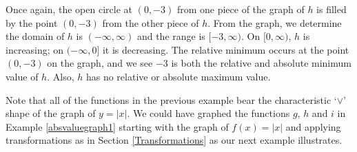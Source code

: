{\begin{enumerate}

Once again, the open circle at $(0,-3)$ from one piece of the graph of $h$ is filled by the point $(0,-3)$ from the other piece of $h$.  From the graph, we determine the domain of $h$ is $(-\infty, \infty)$ and the range is $[-3,\infty)$.   On $[0,\infty)$, $h$ is increasing;  on $(-\infty,0]$ it is decreasing.  The relative minimum occurs at the point $(0,-3)$ on the graph, and we see $-3$ is both the relative and absolute minimum value of $h$.  Also, $h$ has no relative or absolute maximum value.




\end{enumerate}
}

Note that all of the functions in the previous example bear the characteristic `$\vee$' shape of the graph of $y=|x|$.  We could have graphed the functions $g$, $h$ and $i$ in Example \ref{absvaluegraph1} starting with the graph of $f(x)=|x|$ and applying transformations as in Section \ref{Transformations} as our next example illustrates.

\pagebreak


